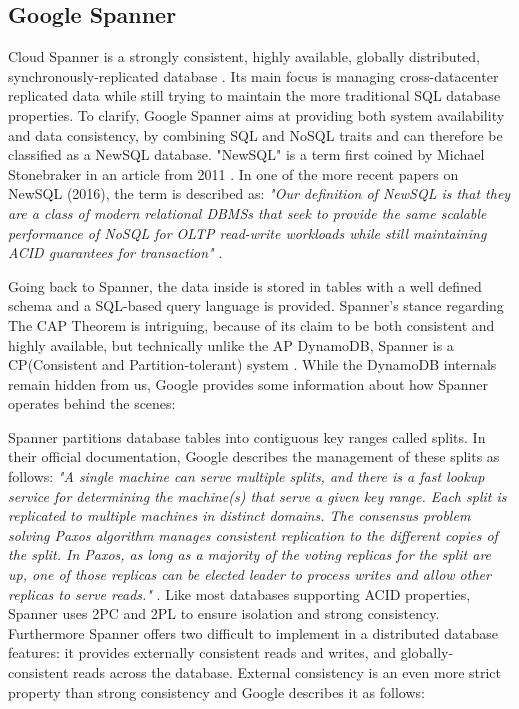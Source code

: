 \documentclass[letterpaper, 10 pt, conference]{ieeeconf}  %
\begin{document}
\subsection{Google Spanner}
Cloud Spanner is a strongly consistent, highly available, globally distributed, synchronously-replicated database \cite{SpannerWebPage}. Its main focus is managing cross-datacenter replicated data while still trying to maintain the more traditional SQL database properties. To clarify, Google Spanner aims at providing both system availability and data consistency, by combining SQL and NoSQL traits and can therefore be classified as a NewSQL database. "NewSQL" is a term first coined by Michael Stonebraker in an article from 2011 \cite{newsql}. In one of the more recent papers on NewSQL (2016), the term is described as:
\textit{"Our definition of NewSQL is that they are a class of modern relational DBMSs that seek to provide the same scalable performance of NoSQL for OLTP read-write workloads while still maintaining ACID guarantees for transaction"} \cite{Pavlo:2016:WRN:3003665.3003674}. \par
Going back to Spanner, the data inside is stored in tables with a well defined schema and a SQL-based query language is provided. Spanner's stance regarding The CAP Theorem is intriguing, because of its claim to be both consistent and highly available, but technically unlike the AP DynamoDB, Spanner is a CP(Consistent and Partition-tolerant) system \cite{SpannerWebPage}. While the DynamoDB internals remain hidden from us, Google provides some information about how Spanner operates behind the scenes: \par
Spanner partitions database tables into contiguous key ranges called splits. In their official documentation, Google describes the management of these splits as follows:
\textit{"A single machine can serve multiple splits, and there is a fast lookup service for determining the machine(s) that serve a given key range. Each split is replicated to multiple machines in distinct domains. The consensus problem solving Paxos algorithm manages consistent replication to the different copies of the split. In Paxos, as long as a majority of the voting replicas for the split are up, one of those replicas can be elected leader to process writes and allow other replicas to serve reads."} \cite{SpannerWebPage}.
Like most databases supporting ACID properties, Spanner uses 2PC and 2PL to ensure isolation and strong consistency. Furthermore Spanner offers two difficult to implement in a distributed database features: it provides externally consistent reads and writes, and globally-consistent reads across the database. External consistency is an even more strict property than strong consistency and Google describes it as follows:
\end{document}
